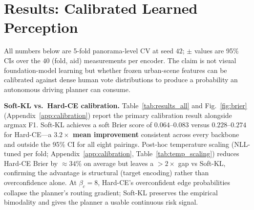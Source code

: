 \documentclass{article}
\begin{document}
\section{Results: Calibrated Learned Perception}
\label{sec:results}

All numbers below are 5-fold panorama-level CV at seed $42$; $\pm$ values are 95\% CIs over the $40$ (fold, aid) measurements per encoder. The claim is not visual foundation-model learning but whether frozen urban-scene features can be calibrated against dense human vote distributions to produce a probability an autonomous driving planner can consume.

\textbf{Soft-KL vs.\ Hard-CE calibration.} Table~\ref{tab:results_all} and Fig.~\ref{fig:brier} (Appendix~\ref{app:calibration}) report the primary calibration result alongside argmax F1. Soft-KL achieves a soft Brier score of $0.064$--$0.083$ versus $0.228$--$0.274$ for Hard-CE---a \textbf{$3.2\times$ mean improvement} consistent across every backbone and outside the 95\% CI for all eight pairings. Post-hoc temperature scaling (NLL-tuned per fold; Appendix~\ref{app:calibration}, Table~\ref{tab:temp_scaling}) reduces Hard-CE Brier by ${\approx}34\%$ on average but leaves a $>2\times$ gap vs Soft-KL, confirming the advantage is structural (target encoding) rather than overconfidence alone. At $\beta_c{=}8$, Hard-CE's overconfident edge probabilities collapse the planner's routing gradient; Soft-KL preserves the empirical bimodality and gives the planner a usable continuous risk signal.
\end{document}
